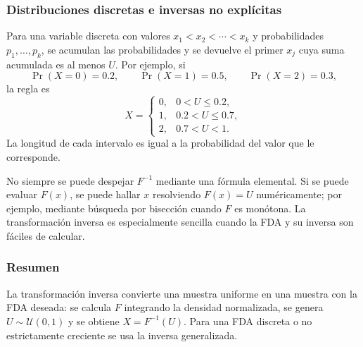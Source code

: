 

\subsubsection{Distribuciones discretas e inversas no explícitas}

Para una variable discreta con valores $x_1<x_2<\cdots<x_k$ y probabilidades
$p_1,\ldots,p_k$, se acumulan las probabilidades y se devuelve el primer $x_j$
cuya suma acumulada es al menos $U$. Por ejemplo, si
\[
    \Pr(X=0)=0.2,\qquad \Pr(X=1)=0.5,\qquad \Pr(X=2)=0.3,
\]
la regla es
\[
    X=\begin{cases}
        0,&0<U\leq0.2,\\
        1,&0.2<U\leq0.7,\\
        2,&0.7<U<1.
    \end{cases}
\]
La longitud de cada intervalo es igual a la probabilidad del valor que le
corresponde.

No siempre se puede despejar $F^{-1}$ mediante una fórmula elemental. Si se
puede evaluar $F(x)$, se puede hallar $x$ resolviendo $F(x)=U$ numéricamente;
por ejemplo, mediante búsqueda por bisección cuando $F$ es monótona. La
transformación inversa es especialmente sencilla cuando la FDA y su inversa
son fáciles de calcular.

\subsubsection{Resumen}

La transformación inversa convierte una muestra uniforme en una muestra con
la FDA deseada: se calcula $F$ integrando la densidad normalizada, se genera
$U\sim\mathcal{U}(0,1)$ y se obtiene $X=F^{-1}(U)$. Para una FDA discreta o no
estrictamente creciente se usa la inversa generalizada.
